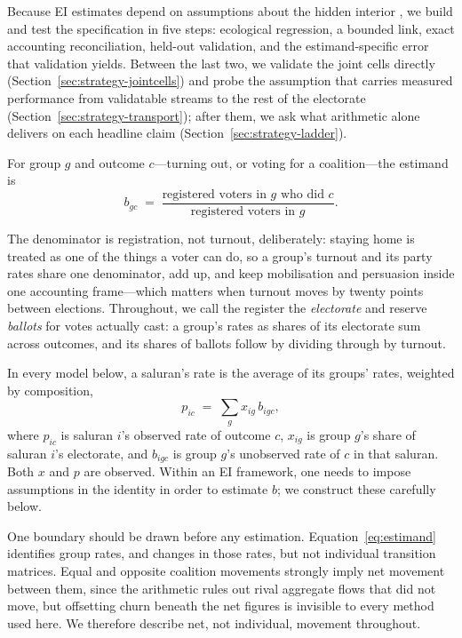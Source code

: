 \documentclass[11pt]{article}
\begin{document}
Because EI estimates depend on assumptions about the hidden interior \cite{robinson1950,freedman1998,cho1998}, we build and test the specification in five steps: ecological regression, a bounded link, exact accounting reconciliation, held-out validation, and the estimand-specific error that validation yields. Between the last two, we validate the joint cells directly (Section~\ref{sec:strategy-jointcells}) and probe the assumption that carries measured performance from validatable streams to the rest of the electorate (Section~\ref{sec:strategy-transport}); after them, we ask what arithmetic alone delivers on each headline claim (Section~\ref{sec:strategy-ladder}).

For group $g$ and outcome $c$---turning out, or voting for a coalition---the estimand is
\begin{equation}
	b_{gc} \;=\; \frac{\text{registered voters in } g \text{ who did } c}{\text{registered voters in } g}.
	\label{eq:estimand}
\end{equation}

The denominator is registration, not turnout, deliberately: staying home is treated as one of the things a voter can do, so a group's turnout and its party rates share one denominator, add up, and keep mobilisation and persuasion inside one accounting frame---which matters when turnout moves by twenty points between elections. Throughout, we call the register the \emph{electorate} and reserve \emph{ballots} for votes actually cast: a group's rates as shares of its electorate sum across outcomes, and its shares of ballots follow by dividing through by turnout.

In every model below, a saluran's rate is the average of its groups' rates, weighted by composition,
\begin{equation}
	p_{ic} \;=\; \sum_g x_{ig}\, b_{igc},
	\label{eq:identity}
\end{equation}
where $p_{ic}$ is saluran $i$'s observed rate of outcome $c$, $x_{ig}$ is group $g$'s share of saluran $i$'s electorate, and $b_{igc}$ is group $g$'s unobserved rate of $c$ in that saluran. Both $x$ and $p$ are observed. Within an EI framework, one needs to impose assumptions in the identity in order to estimate $b$; we construct these carefully below.

One boundary should be drawn before any estimation. Equation~\eqref{eq:estimand} identifies group rates, and changes in those rates, but not individual transition matrices. Equal and opposite coalition movements strongly imply net movement between them, since the arithmetic rules out rival aggregate flows that did not move, but offsetting churn beneath the net figures is invisible to every method used here. We therefore describe net, not individual, movement throughout.
\end{document}
